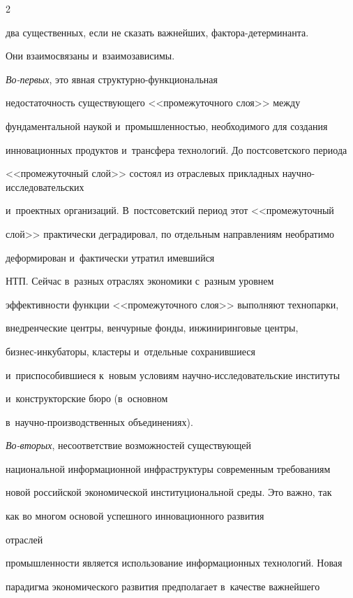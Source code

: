 \begin{multicols}{2}
\begin{enumerate}[1.]
два существенных, если не сказать важнейших, фак\-то\-ра-де\-тер\-ми\-нан\-та. 

Они взаимосвязаны и~взаимозависимы. 

    

    \textit{Во-первых}, это явная струк\-тур\-но-функ\-цио\-наль\-ная 

недостаточность существующего <<промежуточного слоя>> между 

фундаментальной наукой и~промышленностью, необходимого для создания 

инновационных продуктов и~трансфера технологий. До постсоветского периода 

<<промежуточный слой>> состоял из отраслевых прикладных на\-уч\-но-ис\-сле\-до\-ва\-тель\-ских 

и~проектных организаций. В~постсоветский период этот <<промежуточный 

слой>> практически деградировал, по отдельным направлениям необратимо 

деформирован и~фактически утратил имевшийся 

НТП. Сейчас в~разных отраслях экономики с~разным уровнем 

эффективности функции <<промежуточного слоя>> выполняют технопарки, 

внедренческие центры, венчурные фонды, инжиниринговые центры,  

биз\-нес-ин\-ку\-ба\-то\-ры, кластеры и~отдельные сохранившиеся 

и~приспособившиеся к~новым условиям на\-уч\-но-ис\-сле\-до\-ва\-тель\-ские институты

и~конструкторские бюро (в~основном 

    в~на\-уч\-но-про\-из\-вод\-ст\-вен\-ных объединениях).

    

    \textit{Во-вторых}, несоответствие возможностей существующей 

национальной информационной инфраструктуры современным требованиям 

новой российской экономической институциональной среды. Это важно, так 

как во многом основой успешного инновационного развития\linebreak

 отраслей 

промышленности является использование информационных технологий. Новая\linebreak 

парадиг\-ма экономического развития предполагает в~качестве важнейшего 


\end{enumerate}
\end{multicols}
